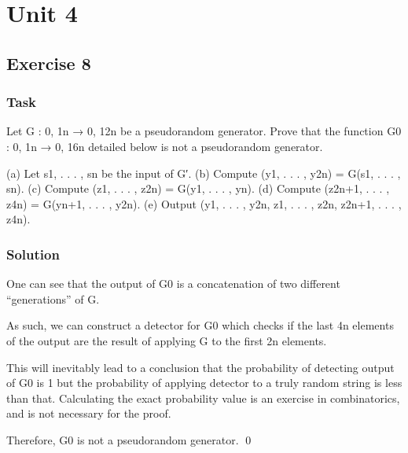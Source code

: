 \chapter{Unit 4}
\section{Exercise 8}

\subsection{Task}
Let G : {0, 1}n → {0, 1}2n be a pseudorandom generator.
Prove that the function G0 : {0, 1}n → {0, 1}6n detailed below is not a pseudorandom generator.

(a) Let s1, . . . , sn be the input of G′.
(b) Compute (y1, . . . , y2n) = G(s1, . . . , sn).
(c) Compute (z1, . . . , z2n) = G(y1, . . . , yn).
(d) Compute (z2n+1, . . . , z4n) = G(yn+1, . . . , y2n).
(e) Output (y1, . . . , y2n, z1, . . . , z2n, z2n+1, . . . , z4n).

\subsection{Solution}

One can see that the output of G0 is a concatenation of two different ``generations'' of G.

As such, we can construct a detector for G0 which checks if the last 4n elements of the output are the result of applying G to the first 2n elements.

This will inevitably lead to a conclusion that the probability of detecting output of G0 is 1 but the probability of applying detector to a truly random string is less than that.
Calculating the exact probability value is an exercise in combinatorics, and is not necessary for the proof.

Therefore, G0 is not a pseudorandom generator. \qed

